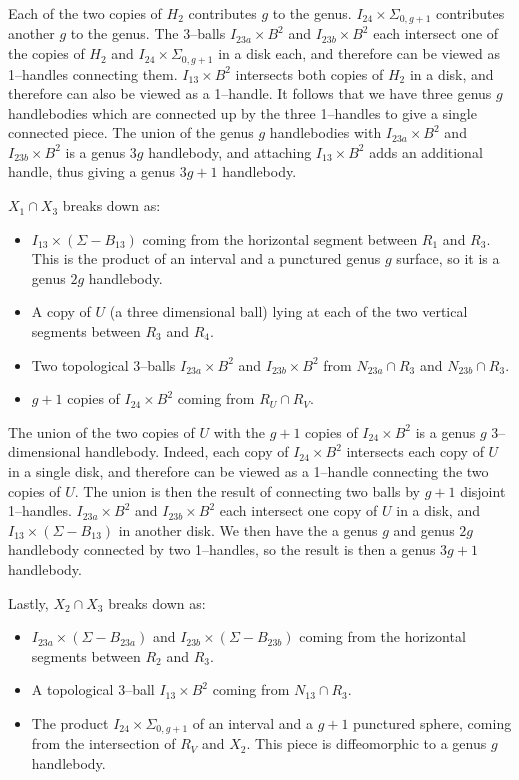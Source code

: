 \documentclass[12pt]{amsart}
\theoremstyle{definition}
\theoremstyle{remark}
\begin{document}
Each of the two copies of $H_2$ contributes $g$ to the genus.
$I_{24} \times \Sigma_{0,g+1}$ contributes another $g$ to the genus.
The 3--balls $I_{23a} \times B^2$ and $I_{23b} \times B^2$ each intersect one of the copies of $H_2$ and $I_{24} \times \Sigma_{0,g+1}$ in a disk each, and therefore can be viewed as 1--handles connecting them.
$I_{13} \times B^2$ intersects both copies of $H_2$ in a disk, and therefore can also be viewed as a 1--handle.
It follows that we have three genus $g$ handlebodies which are connected up by the three 1--handles to give a single connected piece.
The union of the genus $g$ handlebodies with $I_{23a} \times B^2$  and $I_{23b} \times B^2$ is a genus $3g$ handlebody, and attaching $I_{13} \times B^2$ adds an additional handle, thus giving a genus $3g+1$ handlebody.

$X_1 \cap X_3$ breaks down as:

\begin{itemize}
\item $I_{13} \times (\Sigma - B_{13})$ coming from the horizontal segment between $R_1$ and $R_3$.
This is the product of an interval and a punctured genus $g$ surface, so it is a genus $2g$ handlebody.

\item A copy of $U$ (a three dimensional ball) lying at each of the two vertical segments between $R_3$ and $R_4$.
\item Two topological 3--balls $I_{23a} \times B^2$ and $I_{23b} \times B^2$ from $N_{23a} \cap R_3$ and $N_{23b} \cap R_3$.
\item $g+1$ copies of $I_{24} \times B^2$ coming from $R_U \cap R_V$.
\end{itemize}


The union of the two copies of $U$ with the $g+1$ copies of $I_{24} \times B^2$ is a genus $g$ 3--dimensional handlebody.
Indeed, each copy of $I_{24} \times B^2$ intersects each copy of $U$ in a single disk, and therefore can be viewed as a 1--handle connecting the two copies of $U$.
The union is then the result of connecting two balls by $g+1$ disjoint 1--handles.
$I_{23a} \times B^2$ and $I_{23b} \times B^2$ each intersect one copy of $U$ in a disk, and $I_{13} \times (\Sigma - B_{13})$ in another disk.
 We then have the a genus $g$ and genus $2g$ handlebody connected by two 1--handles, so the result is then a genus $3g+1$ handlebody.

Lastly, $X_2 \cap X_3$ breaks down as:
\begin{itemize}
\item $I_{23a} \times (\Sigma - B_{23a})$ and $I_{23b} \times (\Sigma - B_{23b})$ coming from the horizontal segments between $R_2$ and $R_3$.
\item A topological 3--ball $I_{13} \times B^2$ coming from $N_{13} \cap R_3$.
\item The product $I_{24} \times \Sigma_{0,g+1}$ of an interval and a $g+1$ punctured sphere, coming from the intersection of $R_V$ and $X_2$.
This piece is diffeomorphic to a genus $g$ handlebody.
\end{itemize}
\end{document}

